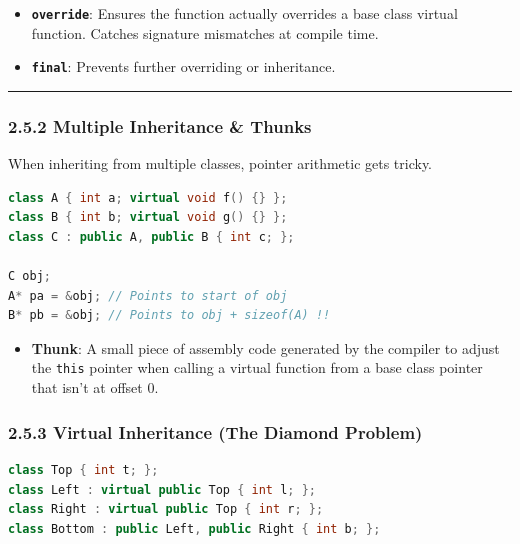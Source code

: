 \begin{itemize}
\tightlist
\item
  \textbf{\passthrough{\lstinline!override!}}: Ensures the function
  actually overrides a base class virtual function. Catches signature
  mismatches at compile time.
\item
  \textbf{\passthrough{\lstinline!final!}}: Prevents further overriding
  or inheritance.
\end{itemize}

\begin{center}\rule{0.5\linewidth}{0.5pt}\end{center}

\hypertarget{multiple-inheritance-thunks}{%
\subsubsection{2.5.2 Multiple Inheritance \&
Thunks}\label{multiple-inheritance-thunks}}

When inheriting from multiple classes, pointer arithmetic gets tricky.

\begin{lstlisting}[language={C++}]
class A { int a; virtual void f() {} };
class B { int b; virtual void g() {} };
class C : public A, public B { int c; };

C obj;
A* pa = &obj; // Points to start of obj
B* pb = &obj; // Points to obj + sizeof(A) !!
\end{lstlisting}

\begin{itemize}
\tightlist
\item
  \textbf{Thunk}: A small piece of assembly code generated by the
  compiler to adjust the \passthrough{\lstinline!this!} pointer when
  calling a virtual function from a base class pointer that isn't at
  offset 0.
\end{itemize}

\hypertarget{virtual-inheritance-the-diamond-problem}{%
\subsubsection{2.5.3 Virtual Inheritance (The Diamond
Problem)}\label{virtual-inheritance-the-diamond-problem}}

\begin{lstlisting}[language={C++}]
class Top { int t; };
class Left : virtual public Top { int l; };
class Right : virtual public Top { int r; };
class Bottom : public Left, public Right { int b; };
\end{lstlisting}

